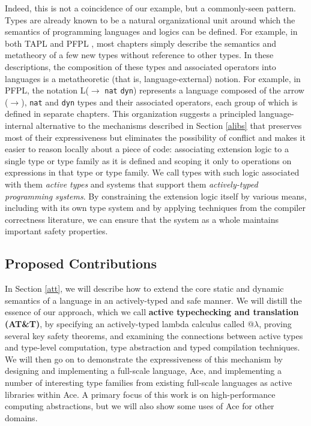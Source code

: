 Indeed, this is not a coincidence of our example, but a commonly-seen pattern. Types are already known to be a natural organizational unit around which the semantics of programming languages and logics can be defined. For example, in both TAPL \cite{tapl} and PFPL \cite{pfpl}, most chapters simply describe the semantics and metatheory of a few new types without reference to other types. In these descriptions, the composition of these types and associated operators into languages is a metatheoretic (that is, language-external) notion. For example, in PFPL, the notation L($\rightarrow$ \verb|nat| \verb|dyn|) represents a language composed of the arrow ($\rightarrow$), \verb|nat| and \verb|dyn| types and their associated operators, each group of which is defined in separate chapters. This organization suggests a principled language-internal alternative to the mechanisms described in Section \ref{alibs} that preserves most of their expressiveness but eliminates the possibility of conflict and makes it easier to reason locally about a piece of code: associating extension logic to a single type or type family as it is defined and scoping it only to operations on expressions in that type or type family.  We call types with such logic associated with them \emph{active types} and systems that support them \emph{actively-typed programming systems}. By constraining the extension logic itself by various means, including with its own type system and by applying techniques from the compiler correctness literature, we can ensure that the system as a whole maintains important safety properties.


\subsection{Proposed Contributions}
In Section \ref{att}, we will describe how to extend the core static and dynamic semantics of a language in an actively-typed and safe manner. We will distill the essence of our approach, which we call \textbf{active typechecking and translation (AT\&T)}, by specifying an actively-typed lambda calculus called @$\lambda$, proving several key safety theorems, and examining the connections between active types and type-level computation, type abstraction and typed compilation techniques. We will then go on to demonstrate the expressiveness of this mechanism by designing and implementing a full-scale language, Ace, and implementing a number of interesting type families from existing full-scale languages as active libraries within Ace. A primary focus of this work is on high-performance computing abstractions, but we will also show some uses of Ace for other domains.

